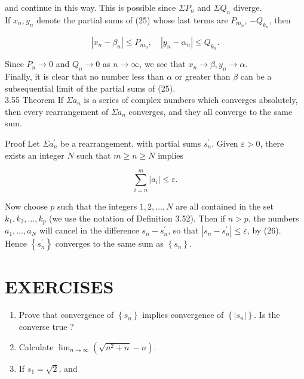 \documentclass[10pt]{article}
\begin{document}
and continue in this way. This is possible since $\Sigma P_{n}$ and $\Sigma Q_{n}$ diverge.\\
If $x_{n}, y_{n}$ denote the partial sums of (25) whose last terms are $P_{m_{n}}$, $-Q_{k_{n}}$, then

$$
\left|x_{n}-\beta_{n}\right| \leq P_{m_{n}}, \quad\left|y_{n}-\alpha_{n}\right| \leq Q_{k_{n}} .
$$

Since $P_{n} \rightarrow 0$ and $Q_{n} \rightarrow 0$ as $n \rightarrow \infty$, we see that $x_{n} \rightarrow \beta, y_{n} \rightarrow \alpha$.\\
Finally, it is clear that no number less than $\alpha$ or greater than $\beta$ can be a subsequential limit of the partial sums of (25).\\
3.55 Theorem If $\Sigma a_{n}$ is a series of complex numbers which converges absolutely, then every rearrangement of $\Sigma a_{n}$ converges, and they all converge to the same sum.

Proof Let $\Sigma a_{n}^{\prime}$ be a rearrangement, with partial sums $s_{n}^{\prime}$. Given $\varepsilon>0$, there exists an integer $N$ such that $m \geq n \geq N$ implies


\begin{equation*}
\sum_{i=n}^{m}\left|a_{i}\right| \leq \varepsilon . \tag{26}
\end{equation*}


Now choose $p$ such that the integers $1,2, \ldots, N$ are all contained in the set $k_{1}, k_{2}, \ldots, k_{p}$ (we use the notation of Definition 3.52). Then if $n>p$, the numbers $a_{1}, \ldots, a_{N}$ will cancel in the difference $s_{n}-s_{n}^{\prime}$, so that $\left|s_{n}-s_{n}^{\prime}\right| \leq \varepsilon$, by (26). Hence $\left\{s_{n}^{\prime}\right\}$ converges to the same sum as $\left\{s_{n}\right\}$.

\section*{EXERCISES}
\begin{enumerate}
  \item Prove that convergence of $\left\{s_{n}\right\}$ implies convergence of $\left\{\left|s_{n}\right|\right\}$. Is the converse true ?
  \item Calculate $\lim _{n \rightarrow \infty}\left(\sqrt{n^{2}+n}-n\right)$.
  \item If $s_{1}=\sqrt{2}$, and
\end{enumerate}
\end{document}
